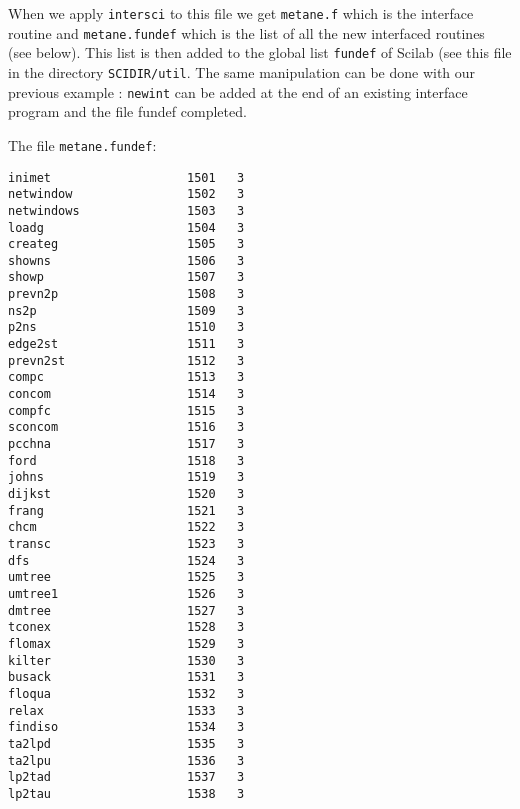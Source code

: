 When we apply {\tt intersci} to this file we get {\tt metane.f} which is 
the interface routine and {\tt  metane.fundef} which is the list of all
the new interfaced routines (see below). This list is then added to the
global list {\tt fundef} of Scilab (see this file in the directory
{\tt SCIDIR/util}. The same manipulation can be done with our previous
example : {\tt newint} can be added at the end of an existing interface program
and the file fundef completed.


The file {\tt  metane.fundef}:
\begin{verbatim}
inimet                   1501   3
netwindow                1502   3
netwindows               1503   3
loadg                    1504   3
createg                  1505   3
showns                   1506   3
showp                    1507   3
prevn2p                  1508   3
ns2p                     1509   3
p2ns                     1510   3
edge2st                  1511   3
prevn2st                 1512   3
compc                    1513   3
concom                   1514   3
compfc                   1515   3
sconcom                  1516   3
pcchna                   1517   3
ford                     1518   3
johns                    1519   3
dijkst                   1520   3
frang                    1521   3
chcm                     1522   3
transc                   1523   3
dfs                      1524   3
umtree                   1525   3
umtree1                  1526   3
dmtree                   1527   3
tconex                   1528   3
flomax                   1529   3
kilter                   1530   3
busack                   1531   3
floqua                   1532   3
relax                    1533   3
findiso                  1534   3
ta2lpd                   1535   3
ta2lpu                   1536   3
lp2tad                   1537   3
lp2tau                   1538   3
\end{verbatim}
